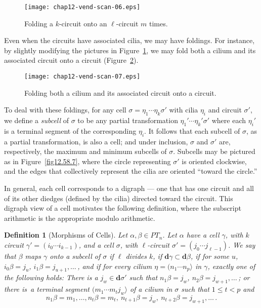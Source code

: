 \documentclass{surv-l}
\numberwithin{equation}{section}
\numberwithin{table}{section}
\numberwithin{figure}{section}
\newtheorem{definition}[equation]{Definition}
\theoremstyle{definition}
\begin{document}
\setcounter{figure}{3}
\begin{figure}[!h]
\texttt{[image: chap12-vend-scan-06.eps]}
\caption{Folding a $k$-circuit onto an $\ell$-circuit $m$
times.\label{fig12.58.4}}
\end{figure}

Even when the circuits have associated cilia, we may have
foldings. For instance, by slightly modifying the pictures in
Figure~\ref{fig12.58.4}, we may fold both a cilium and its
associated circuit onto a circuit (Figure~\ref{fig12.58.5}).

\begin{figure}[!h]
\texttt{[image: chap12-vend-scan-07.eps]}
\caption{Folding both a cilium and its associated circuit onto a circuit.\label{fig12.58.5}}
\end{figure}


To deal with these foldings, for any cell
$\sigma=\eta_{1}\cdots\eta_{k}\sigma'$ with cilia $\eta_{i}$ and
circuit $\sigma'$, we define a \emph{subcell} of
$\sigma$ to be any partial transformation
$\eta_{1}'\cdots\eta_{k}'\sigma'$ where each $\eta_{i}'$ is a
terminal segment of the corresponding $\eta_{i}$. It follows that
each subcell of $\sigma$, as a partial transformation, is also a
cell; and under inclusion, $\sigma$ and $\sigma'$ are,
respectively, the maximum and minimum subcells of $\sigma$.
Subcells may be pictured as in Figure~\ref{fig12.58.7}, where the
circle representing $\sigma'$ is oriented clockwise, and the edges
that collectively represent the cilia are oriented ``toward the
circle.''

In general, each cell corresponds to a
digraph --- one that has one circuit and all of its other
diedges (defined by the cilia) directed toward the circuit. This
digraph view of a cell motivates the following definition, where
the subscript arithmetic is the appropriate modulo arithmetic.

\setcounter{equation}{5}
\begin{definition}[Morphisms of Cells]\label{defn12.58.6}
Let $\alpha,\beta\in PT_{n}$. Let $\alpha$ have a cell $\gamma$,
with $k$ circuit $\gamma'=(i_{0}\cdots i_{k-1})$, and a cell
$\sigma$, with $\ell$-circuit $\sigma'=(j_{0} \cdots j_{\ell-1})$.
We say that $\beta$ maps $\gamma$ onto a subcell of $\sigma$ if
$\ell$ divides $k$, if $\mathbf{d}\gamma\subset \mathbf{d}\beta$,
if for some $u$, $i_{0}\beta=j_{u}$, $i_{1}\beta=j_{u+1}, \ldots\,$, and
if for every cilium $\eta=(n_{1}\cdots n_{p}\rangle$ in $\gamma$,
exactly one of the following holds: There is a $j_{w}\in
\mathbf{d}\sigma'$ such that $n_{1}\beta=j_{w}$,
$n_{2}\beta=j_{w+1},\ldots\,$; or there is~a terminal segment
$(m_{1}\cdots m_{t}j_{w}\rangle$ of a cilium in $\sigma$ such that
$1\leq t<p$ and
\[
n_{1}\beta=m_{1},\ldots, n_{t}\beta=m_{t},\ n_{t+1}\beta=j_{w},\ n_{t+2}\beta=j_{w+1},\ldots\,.
\]
\end{definition}
\end{document}
